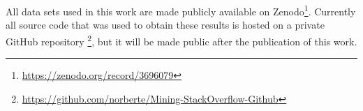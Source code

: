         All data sets used in this work are made publicly available on Zenodo\footnote{\url{https://zenodo.org/record/3696079}}. Currently all source code that was used to obtain these results is hosted on a private GitHub repository \footnote{\url{https://github.com/norberte/Mining-StackOverflow-Github}}, but it will be made public after the publication of this work.